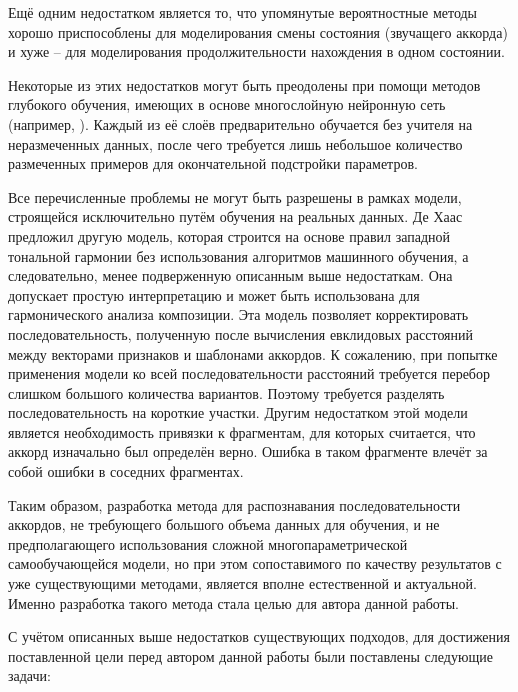 Ещё одним недостатком является то, что упомянутые вероятностные методы хорошо
приспособлены для моделирования смены состояния (звучащего аккорда) и хуже --
для моделирования продолжительности нахождения в одном состоянии.

Некоторые из этих недостатков могут быть преодолены при помощи методов глубокого
обучения, имеющих в основе многослойную нейронную сеть (например,
\cite{Vincent2010}). Каждый из её слоёв предварительно обучается без учителя на
неразмеченных данных, после чего требуется лишь небольшое количество размеченных
примеров для окончательной подстройки параметров.

Все перечисленные проблемы не могут быть разрешены в рамках модели, строящейся
исключительно путём обучения на реальных данных. Де Хаас предложил другую
модель, которая строится на основе правил западной тональной гармонии без
использования алгоритмов машинного обучения, а следовательно, менее подверженную
описанным выше недостаткам. Она допускает простую интерпретацию и может быть
использована для гармонического анализа композиции. Эта модель позволяет
корректировать последовательность, полученную после вычисления евклидовых
расстояний между векторами признаков и шаблонами аккордов. К сожалению, при
попытке применения модели ко всей последовательности расстояний требуется
перебор слишком большого количества вариантов. Поэтому требуется разделять
последовательность на короткие участки. Другим недостатком этой модели является
необходимость привязки к фрагментам, для которых считается, что аккорд
изначально был определён верно. Ошибка в таком фрагменте влечёт за собой ошибки
в соседних фрагментах.

Таким образом, разработка метода для распознавания последовательности аккордов,
не требующего большого объема данных для обучения, и не предполагающего
использования сложной многопараметрической самообучающейся модели, но при этом
сопоставимого по качеству результатов с уже существующими методами, является
вполне естественной и актуальной. Именно разработка такого метода стала целью
для автора данной работы.

С учётом описанных выше недостатков существующих подходов, для достижения
поставленной цели перед автором данной работы были поставлены следующие
задачи:


